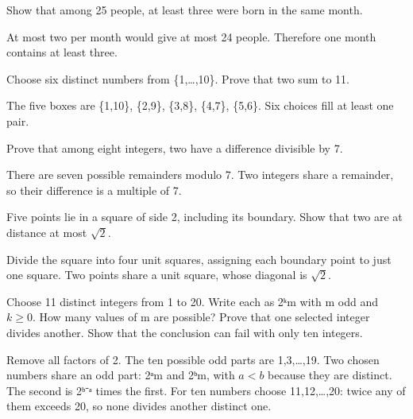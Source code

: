 \documentclass[11pt]{article}
\begin{document}
Show that among 25 people, at least three were born in the same month.\par
At most two per month would give at most 24 people. Therefore one month contains at least three.\par
{}
Choose six distinct numbers from \{1,…,10\}. Prove that two sum to 11.\par
The five boxes are \{1,10\}, \{2,9\}, \{3,8\}, \{4,7\}, \{5,6\}. Six choices fill at least one pair.\par
{}
Prove that among eight integers, two have a difference divisible by 7.\par
There are seven possible remainders modulo 7. Two integers share a remainder, so their difference is a multiple of 7.\par
{}
Five points lie in a square of side 2, including its boundary. Show that two are at distance at most \(\sqrt{2}\).\par
Divide the square into four unit squares, assigning each boundary point to just one square. Two points share a unit square, whose diagonal is \(\sqrt{2}\).\par
{}
Choose 11 distinct integers from 1 to 20. Write each as 2ᵏm with m odd and \(k \geq  0\). How many values of m are possible? Prove that one selected integer divides another. Show that the conclusion can fail with only ten integers.\par
Remove all factors of 2. The ten possible odd parts are 1,3,…,19. Two chosen numbers share an odd part: 2ᵃm and 2ᵇm, with \(a < b\) because they are distinct. The second is 2ᵇ⁻ᵃ times the first. For ten numbers choose 11,12,…,20: twice any of them exceeds 20, so none divides another distinct one.\par
\end{document}
